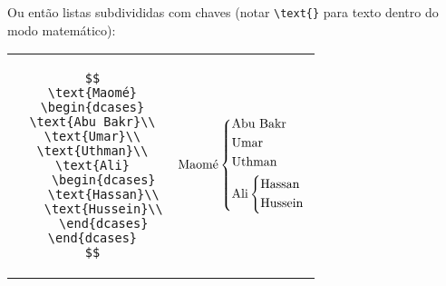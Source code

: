  
 Ou então listas subdivididas com chaves (notar \verb+\text{}+ para texto dentro do modo matemático):
 
  \begin{tabular}{cc}
 \begin{minipage}{0.4\textwidth}
\begin{verbatim}
 $$
 \text{Maomé}
 \begin{dcases}
 \text{Abu Bakr}\\
 \text{Umar}\\
 \text{Uthman}\\
 \text{Ali}
    \begin{dcases}
    \text{Hassan}\\
    \text{Hussein}\\
    \end{dcases}
 \end{dcases}
 $$
\end{verbatim}
\end{minipage}
&

\begin{minipage}{0.4\textwidth}
 $$
 \text{Maomé}
 \begin{dcases}
 \text{Abu Bakr}\\
 \text{Umar}\\
 \text{Uthman}\\
 \text{Ali}
    \begin{dcases}
    \text{Hassan}\\
    \text{Hussein}\\
    \end{dcases}
 \end{dcases}
 $$
\end{minipage}
 \end{tabular}
 
 